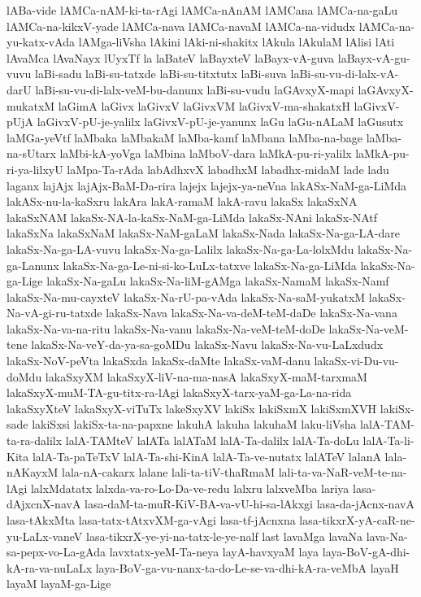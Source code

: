 {lABa-vide
lAMCa-nAM-ki-ta-rAgi
lAMCa-nAnAM
lAMCana
lAMCa-na-gaLu
lAMCa-na-kikxV-yade
lAMCa-nava
lAMCa-navaM
lAMCa-na-vidudx
lAMCa-na-yu-katx-vAda
lAMga-liVsha
lAkini
lAki-ni-shakitx
lAkula
lAkulaM
lAlisi
lAti
lAvaMca
lAvaNayx
lUyxTf
la
laBateV
laBayxteV
laBayx-vA-guva
laBayx-vA-gu-vuvu
laBi-sadu
laBi-su-tatxde
laBi-su-titxtutx
laBi-suva
laBi-su-vu-di-lalx-vA-darU
laBi-su-vu-di-lalx-veM-bu-danunx
laBi-su-vudu
laGAvxyX-mapi
laGAvxyX-mukatxM
laGimA
laGivx
laGivxV
laGivxVM
laGivxV-ma-shakatxH
laGivxV-pUjA
laGivxV-pU-je-yalilx
laGivxV-pU-je-yanunx
laGu
laGu-nALaM
laGusutx
laMGa-yeVtf
laMbaka
laMbakaM
laMba-kamf
laMbana
laMba-na-bage
laMba-na-sUtarx
laMbi-kA-yoVga
laMbina
laMboV-dara
laMkA-pu-ri-yalilx
laMkA-pu-ri-ya-lilxyU
laMpa-Ta-rAda
labAdhxvX
labadhxM
labadhx-midaM
lade
ladu
laganx
lajAjx
lajAjx-BaM-Da-rira
lajejx
lajejx-ya-neVna
lakASx-NaM-ga-LiMda
lakASx-nu-la-kaSxru
lakAra
lakA-ramaM
lakA-ravu
lakaSx
lakaSxNA
lakaSxNAM
lakaSx-NA-la-kaSx-NaM-ga-LiMda
lakaSx-NAni
lakaSx-NAtf
lakaSxNa
lakaSxNaM
lakaSx-NaM-gaLaM
lakaSx-Nada
lakaSx-Na-ga-LA-dare
lakaSx-Na-ga-LA-vuvu
lakaSx-Na-ga-Lalilx
lakaSx-Na-ga-La-lolxMdu
lakaSx-Na-ga-Lanunx
lakaSx-Na-ga-Le-ni-si-ko-LuLx-tatxve
lakaSx-Na-ga-LiMda
lakaSx-Na-ga-Lige
lakaSx-Na-gaLu
lakaSx-Na-liM-gAMga
lakaSx-NamaM
lakaSx-Namf
lakaSx-Na-mu-cayxteV
lakaSx-Na-rU-pa-vAda
lakaSx-Na-saM-yukatxM
lakaSx-Na-vA-gi-ru-tatxde
lakaSx-Nava
lakaSx-Na-va-deM-teM-daDe
lakaSx-Na-vana
lakaSx-Na-va-na-ritu
lakaSx-Na-vanu
lakaSx-Na-veM-teM-doDe
lakaSx-Na-veM-tene
lakaSx-Na-veY-da-ya-sa-goMDu
lakaSx-Navu
lakaSx-Na-vu-LaLxdudx
lakaSx-NoV-peVta
lakaSxda
lakaSx-daMte
lakaSx-vaM-danu
lakaSx-vi-Du-vu-doMdu
lakaSxyXM
lakaSxyX-liV-na-ma-nasA
lakaSxyX-maM-tarxmaM
lakaSxyX-muM-TA-gu-titx-ra-lAgi
lakaSxyX-tarx-yaM-ga-La-na-rida
lakaSxyXteV
lakaSxyX-viTuTx
lakeSxyXV
lakiSx
lakiSxmX
lakiSxmXVH
lakiSx-sade
lakiSxsi
lakiSx-ta-na-papxne
lakuhA
lakuha
lakuhaM
laku-liVsha
lalA-TAM-ta-ra-dalilx
lalA-TAMteV
lalATa
lalATaM
lalA-Ta-dalilx
lalA-Ta-doLu
lalA-Ta-li-Kita
lalA-Ta-paTeTxV
lalA-Ta-shi-KinA
lalA-Ta-ve-nutatx
lalATeV
lalanA
lala-nAKayxM
lala-nA-cakarx
lalane
lali-ta-tiV-thaRmaM
lali-ta-va-NaR-veM-te-na-lAgi
lalxMdatatx
lalxda-va-ro-Lo-Da-ve-redu
lalxru
lalxveMba
lariya
lasa-dAjxcnX-navA
lasa-daM-ta-muR-KiV-BA-va-vU-hi-sa-lAkxgi
lasa-da-jAcnx-navA
lasa-tAkxMta
lasa-tatx-tAtxvXM-ga-vAgi
lasa-tf-jAcnxna
lasa-tikxrX-yA-caR-ne-yu-LaLx-vaneV
lasa-tikxrX-ye-yi-na-tatx-le-ye-nalf
last
lavaMga
lavaNa
lava-Na-sa-pepx-vo-La-gAda
lavxtatx-yeM-Ta-neya
layA-havxyaM
laya
laya-BoV-gA-dhi-kA-ra-va-nuLaLx
laya-BoV-ga-vu-nanx-ta-do-Le-se-va-dhi-kA-ra-veMbA
layaH
layaM
layaM-ga-Lige
}
